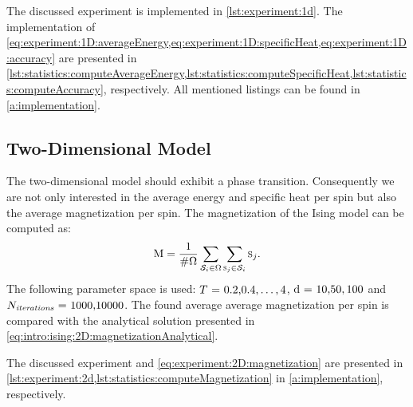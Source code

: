 	The discussed experiment is implemented in \cref{lst:experiment:1d}. 
	The implementation of \cref{eq:experiment:1D:averageEnergy,eq:experiment:1D:specificHeat,eq:experiment:1D:accuracy}
	are presented in \cref{lst:statistics:computeAverageEnergy,lst:statistics:computeSpecificHeat,lst:statistics:computeAccuracy}, respectively. 
	All mentioned listings can be found in \cref{a:implementation}.	
	

\subsection{Two-Dimensional Model}
\label{ss:experiment:2D}
	The two-dimensional model should exhibit a phase transition. Consequently we are not only interested in the average energy and specific heat per spin but also the average magnetization per spin. The magnetization of the Ising model can be computed as:
	\begin{equation}\label{eq:experiment:2D:magnetization}
		\mathrm{M} = \frac{1}{\#\Omega} \sum_{\mathcal{S}_{i} \in \Omega} \sum_{\textsc{s}_{j} \in \mathcal{S}_{i}} \textsc{s}_{j}.
	\end{equation}
	The following parameter space is used: $\mbox{\temperature = 0.2,} 0.4, \dotsc, 4$, $\mbox{\dimensionality = 10,} 50, 100$ and $\mbox{\numberOfIterations = 1000,} 10000$. The found average average magnetization per spin is compared with the analytical solution presented in \cref{eq:intro:ising:2D:magnetizationAnalytical}.

	The discussed experiment and \cref{eq:experiment:2D:magnetization} are presented in \cref{lst:experiment:2d,lst:statistics:computeMagnetization} in \cref{a:implementation}, respectively.